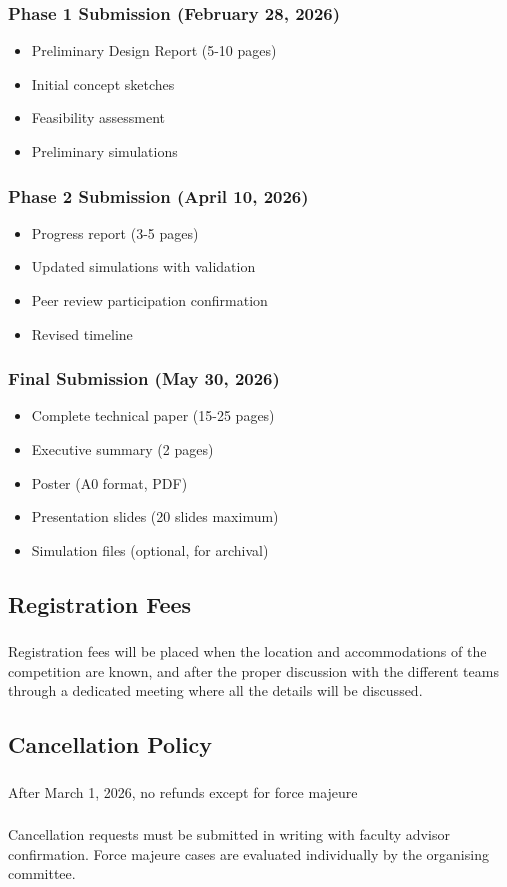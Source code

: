 \subsubsection{Phase 1 Submission (February 28, 2026)}
\begin{itemize}[noitemsep]
    \item Preliminary Design Report (5-10 pages)
    \item Initial concept sketches
    \item Feasibility assessment
    \item Preliminary simulations
\end{itemize}

\subsubsection{Phase 2 Submission (April 10, 2026)}
\begin{itemize}[noitemsep]
    \item Progress report (3-5 pages)
    \item Updated simulations with validation
    \item Peer review participation confirmation
    \item Revised timeline
\end{itemize}

\subsubsection{Final Submission (May 30, 2026)}
\begin{itemize}[noitemsep]
    \item Complete technical paper (15-25 pages)
    \item Executive summary (2 pages)
    \item Poster (A0 format, PDF)
    \item Presentation slides (20 slides maximum)
    \item Simulation files (optional, for archival)
\end{itemize}

\subsection{Registration Fees}

\subsubsection{}
Registration fees will be placed when the location and accommodations of the competition are known, and after the proper discussion with the different teams through a dedicated meeting where all the details will be discussed.

\subsection{Cancellation Policy}

\subsubsection{}
After March 1, 2026, no refunds except for force majeure

\subsubsection{}
Cancellation requests must be submitted in writing with faculty advisor confirmation. Force majeure cases are evaluated individually by the organising committee.
